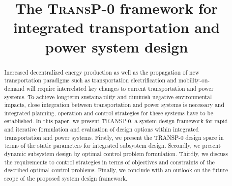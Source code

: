 \title{The \textsc{TransP-0} framework for integrated transportation and power system design}

\author{
	\and
}

\maketitle

\begin{abstract}
	Increased decentralized energy production as well as the propagation of new transportation paradigms such as transportation electrification and mobility-on-demand will require interrelated key changes to current transportation and power systems.
	To achieve longterm sustainability and diminish negative environmental impacts, close integration between transportation and power systems is necessary and integrated planning, operation and control strategies for these systems have to be established. In this paper, we present TRANSP-0, a system design framework for rapid and iterative formulation and evaluation of design options within integrated transportation and power systems. Firstly, we present the TRANSP-0 design space in terms of the static parameters for integrated subsystem design. Secondly, we present dynamic subsystem design by optimal control problem formulation. Thirdly, we discuss the requirements to control strategies in terms of objectives and constraints of the described optimal control problems. Finally, we conclude with an outlook on the future scope of the proposed system design framework.
	
\end{abstract}
